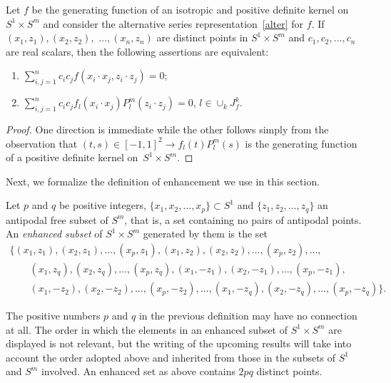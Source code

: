 \begin{Lemma}\label{basic}
Let $f$ be the generating function of an isotropic and positive definite kernel on~\mbox{$S^1 \times S^m$} and consider the alternative series representation~\eqref{alter} for $f$. If $(x_1,z_1),(x_2,z_2),$ $ \ldots, (x_n,z_n)$ are distinct points in $S^1 \times S^m$ and $c_1, c_2, \ldots, c_n$ are real scalars, then the following assertions are equivalent:
\begin{enumerate}\itemsep=0pt
\item[$(i)$] $\sum\limits_{i,j=1}^n c_i c_j f(x_i \cdot x_j,z_i \cdot z_j)=0$;
\item[$(ii)$] $\sum\limits_{i,j=1}^n c_i c_j f_l(x_i \cdot x_j) P_l^m(z_i \cdot z_j)=0$, $l\in \cup_{k}J_f^k$.
\end{enumerate}
\end{Lemma}
\begin{proof}
One direction is immediate while the other follows simply from the observation that $(t,s) \in [-1,1]^2 \to f_l(t)P_l^m(s)$ is the generating function of a positive def\/inite kernel \linebreak on~\mbox{$S^1 \times S^m$}.
\end{proof}

Next, we formalize the def\/inition of enhancement we use in this section.

\begin{Definition} Let $p$ and $q$ be positive integers, $\{x_1,x_2, \ldots, x_p\} \subset S^1$ and $\{z_1,z_2, \ldots, z_q\}$ an antipodal free subset of $S^m$, that is, a set containing no pairs of antipodal points. An {\em enhanced subset} of $S^1 \times S^m$ generated by them is the set
\begin{gather*}\big\{(x_1,z_1), (x_2,z_1), \ldots, (x_p,z_1), (x_1,z_2), (x_2,z_2), \ldots, (x_p,z_2),\ldots, \\
\qquad{} (x_1,z_q),(x_2,z_q),\ldots, (x_p,z_q), (x_1,-z_1), (x_2,-z_1), \ldots, (x_p,-z_1), \\
\qquad{} (x_1,-z_2), (x_2,-z_2), \ldots,(x_p,-z_2),\ldots, (x_1,-z_q), (x_2,-z_q), \ldots, (x_p,-z_q)\big\}.\end{gather*}
\end{Definition}

The positive numbers $p$ and $q$ in the previous def\/inition may have no connection at all. The order in which the elements in an enhanced subset of $S^1 \times S^m$ are displayed is not relevant, but the writing of the upcoming results will take into account the order adopted above and inherited from those in the subsets of $S^1$ and $S^m$ involved. An enhanced set as above contains $2pq$ distinct points.

